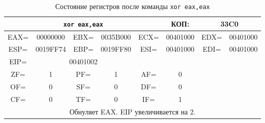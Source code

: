 \begin{table}[H]
    \centering
    \caption{Состояние регистров после команды \texttt{xor eax,eax}}
    \label{tab:after_xor}
    \small
    \renewcommand{\arraystretch}{1.3}
    \begin{tabular}{|c|c|c|c|c|c|c|c|}
    \hline
    \multicolumn{5}{|c|}{\cellcolor{green!40}\textbf{\texttt{xor eax,eax}}} & \cellcolor{green!20} КОП: & \multicolumn{2}{c|}{\cellcolor{green!20} 33C0} \\
    \hline
    \cellcolor{blue!30} EAX= & \cellcolor{red!70} 00000000 & \cellcolor{blue!30} EBX= & 0035B000 & \cellcolor{blue!30} ECX= & 00401000 & \cellcolor{blue!30} EDX= & 00401000 \\
    \hline
    \cellcolor{blue!30} ESP= & 0019FF74 & \cellcolor{blue!30} EBP= & 0019FF80 & \cellcolor{blue!30} ESI= & 00401000 & \cellcolor{blue!30} EDI= & 00401000 \\
    \hline
    \cellcolor{blue!30} EIP= & \multicolumn{3}{c|}{\cellcolor{red!70} 00401002} & \multicolumn{4}{c|}{} \\
    \hline
    \cellcolor{pink} ZF= & 1 & \cellcolor{pink} PF= & 1 & \cellcolor{pink} AF= & 0 & \multicolumn{2}{c|}{\cellcolor{gray!50}} \\
    \cline{1-6}
    \cellcolor{pink} OF= & 0 & \cellcolor{pink} SF= & 0 & \cellcolor{pink} DF= & 0 & \multicolumn{2}{c|}{\cellcolor{gray!50}} \\
    \cline{1-6}
    \cellcolor{pink} CF= & 0 & \cellcolor{pink} TF= & 0 & \cellcolor{pink} IF= & 1 & \multicolumn{2}{c|}{\cellcolor{gray!50}} \\
    \hline
    \multicolumn{8}{|p{14cm}|}{Обнуляет EAX. EIP увеличивается на 2.} \\
    \hline
    \end{tabular}
\end{table}

